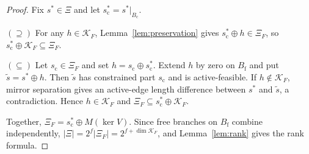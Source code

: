 \begin{proof}
Fix $s^\ast \in \Xi$ and let $s^\ast_{\mathrm{c}} = s^\ast|_{B_{\mathrm{c}}}$.

$(\supseteq)$ For any $h \in \mathcal{K}_F$, Lemma~\ref{lem:preservation} gives
$s^\ast_{\mathrm{c}} \oplus h \in \Xi_F$, so $s^\ast_{\mathrm{c}} \oplus \mathcal{K}_F \subseteq \Xi_F$.

$(\subseteq)$ Let $s_{\mathrm{c}} \in \Xi_F$ and set $h = s_{\mathrm{c}} \oplus s^\ast_{\mathrm{c}}$.
Extend $h$ by zero on $B_{\mathrm{f}}$ and put $\widetilde{s}=s^\ast\oplus h$. Then $\widetilde{s}$ has constrained part $s_{\mathrm{c}}$ and is active-feasible. If $h \notin \mathcal{K}_F$, mirror separation gives an active-edge length difference between $s^\ast$ and $\widetilde{s}$, a contradiction. Hence $h \in \mathcal{K}_F$ and
$\Xi_F \subseteq s^\ast_{\mathrm{c}} \oplus \mathcal{K}_F$.

Together, $\Xi_F = s^\ast_{\mathrm{c}} \oplus M(\ker V)$. Since free branches on
$B_{\mathrm{f}}$ combine independently, $\lvert\Xi\rvert = 2^f \lvert\Xi_F\rvert
= 2^{f + \dim\mathcal{K}_F}$, and Lemma~\ref{lem:rank} gives the rank formula.
\end{proof}
